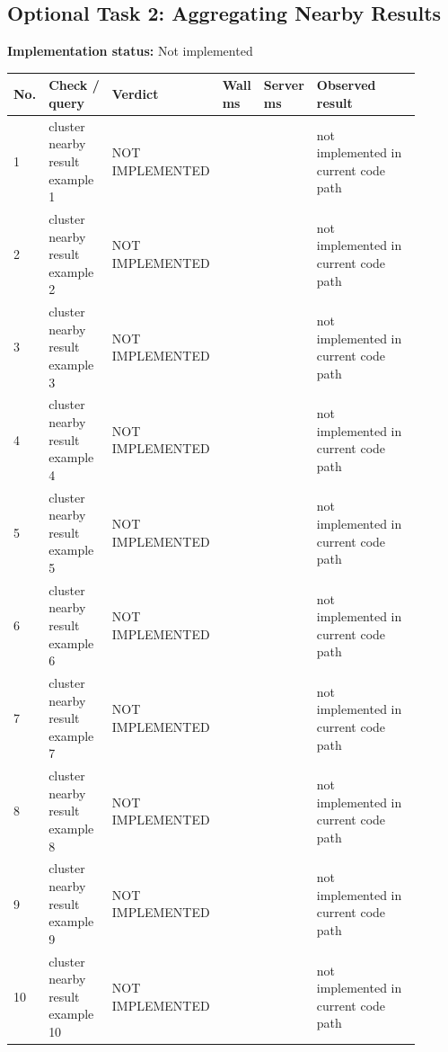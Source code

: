 \documentclass[10pt,a4paper]{article}
\begin{document}
\subsection{Optional Task 2: Aggregating Nearby Results}
\textbf{Implementation status:} Not implemented\\
\scriptsize
\begin{longtable}{|P{0.045\linewidth}|P{0.19\linewidth}|P{0.105\linewidth}|P{0.085\linewidth}|P{0.085\linewidth}|P{0.385\linewidth}|}
\hline
\textbf{No.} & \textbf{Check / query} & \textbf{Verdict} & \textbf{Wall ms} & \textbf{Server ms} & \textbf{Observed result}\\ \hline
{} 1 & cluster nearby result example 1 & NOT IMPLEMENTED &  &  & not implemented in current code path\\ \hline
{} 2 & cluster nearby result example 2 & NOT IMPLEMENTED &  &  & not implemented in current code path\\ \hline
{} 3 & cluster nearby result example 3 & NOT IMPLEMENTED &  &  & not implemented in current code path\\ \hline
{} 4 & cluster nearby result example 4 & NOT IMPLEMENTED &  &  & not implemented in current code path\\ \hline
{} 5 & cluster nearby result example 5 & NOT IMPLEMENTED &  &  & not implemented in current code path\\ \hline
{} 6 & cluster nearby result example 6 & NOT IMPLEMENTED &  &  & not implemented in current code path\\ \hline
{} 7 & cluster nearby result example 7 & NOT IMPLEMENTED &  &  & not implemented in current code path\\ \hline
{} 8 & cluster nearby result example 8 & NOT IMPLEMENTED &  &  & not implemented in current code path\\ \hline
{} 9 & cluster nearby result example 9 & NOT IMPLEMENTED &  &  & not implemented in current code path\\ \hline
{} 10 & cluster nearby result example 10 & NOT IMPLEMENTED &  &  & not implemented in current code path\\ \hline
\end{longtable}
\normalsize
\end{document}
